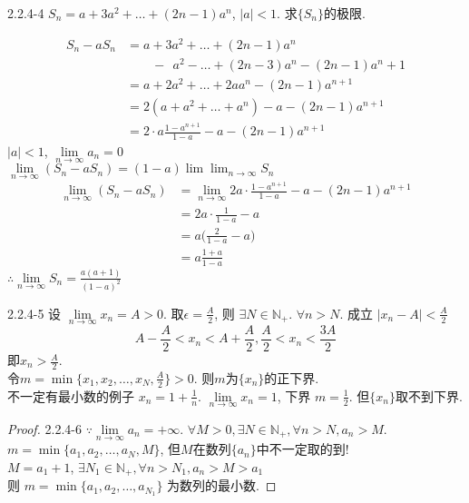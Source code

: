 \begin{qs}
	2.2.4-4
	$ S_n = a+3a^2+\dots+(2n-1)a^n $, $ |a|<1 $. 求$ \{S_n\} $的极限.
\end{qs}
\begin{solve}
	\begin{align*}
		S_n-aS_n
		&=a+3a^2+\dots+(2n-1)a^n\\
		&\qquad-\;\,a^2-\dots+(2n-3)a^n-(2n-1)a^n+1\\
		&=a+2a^2+\dots+2aa^n-(2n-1)a^{n+1}\\
		&=2(a+a^2+\dots+a^n)-a-(2n-1)a^{n+1}\\
		&=2\cdot{a}\frac{1-a^{n+1}}{1-a}-a-(2n-1)a^{n+1}
	\end{align*}
	$ |a|<1 $, $ \lim\limits_{n\rightarrow\infty}a_n=0 $\\
	$ \lim\limits_{n\rightarrow\infty}(S_n-aS_n) = (1-a)\lim\lim_{n\rightarrow\infty}S_n $
	\begin{align*}
		\lim_{n\rightarrow\infty}(S_n-aS_n)
		&=\lim_{n\rightarrow\infty}
		2a\cdot\frac{1-a^{n+1}}{1-a}-a-(2n-1)a^{n+1}\\
		&=2a\cdot\frac{1}{1-a}-a\\
		&=a\Big(\frac{2}{1-a}-a\Big)\\
		&=a\frac{1+a}{1-a}
	\end{align*}
$ \therefore \lim\limits_{n\rightarrow\infty} S_n = \frac{a(a+1)}{(1-a)^2} $
\end{solve}

\begin{solve}
	2.2.4-5
	设 $ \lim\limits_{n\rightarrow\infty} x_n = A>0 $. 取$ \epsilon = \frac{A}{2} $, 则 $ \exists N\in\mathbb{N}_+ $. $ \forall n>N $. 成立 $ |x_n-A|<\frac{A}{2} $ 
	\begin{equation*}
		A-\frac{A}{2}<x_n<A+\frac{A}{2}, \frac{A}{2}<x_n<\frac{3A}{2}
	\end{equation*}
	即$ x_n>\frac{A}{2} $.\\
	令$ m = \min\{x_1,x_2,\dots,x_N,\frac{A}{2}\} >0 $. 则$ m $为$ \{x_n\} $的正下界.\\
	不一定有最小数的例子 $ x_n = 1+\frac{1}{n} $. $ \lim\limits_{n\rightarrow\infty}x_n = 1 $, 下界 $ m=  \frac{1}{2} $. 但$ \{x_n\} $取不到下界.
\end{solve}

\begin{proof}
	2.2.4-6
	$ \because\lim\limits_{n\rightarrow\infty} a_n = +\infty $. $ \forall M>0, \exists N\in\mathbb{N}_+, \forall n>N, a_n>M $.\\
	$ m = \min\{a_1,a_2,\dots,a_N,M\} $, 但$ M $在数列$ \{a_n\} $中不一定取的到!\\
	$ M=a_1+1 $, $ \exists N_1\in\mathbb{N}_+, \forall n>N_1, a_n>M>a_1 $\\
	则 $ m = \min\{a_1,a_2,\dots,a_{N_1}\} $ 为数列的最小数.	
\end{proof}

